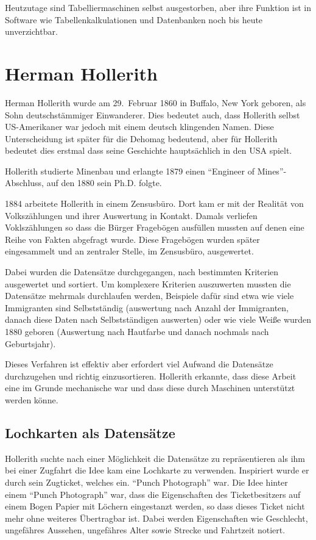 \documentclass[parskip=half]{scrartcl}
\begin{document}
Heutzutage sind Tabelliermaschinen selbst ausgestorben, aber ihre Funktion ist
in Software wie Tabellenkalkulationen und Datenbanken noch bis heute
unverzichtbar.

\section{Herman Hollerith}
\label{sec:hollerith}

Herman Hollerith wurde am 29.~Februar 1860 in Buffalo, New York geboren, als
Sohn deutschstämmiger Einwanderer. Dies bedeutet auch, dass Hollerith selbst
US-Amerikaner war jedoch mit einem deutsch klingenden Namen. Diese
Unterscheidung ist später für die Dehomag bedeutend, aber für Hollerith
bedeutet dies erstmal dass seine Geschichte hauptsächlich in den USA spielt.

Hollerith studierte Minenbau und erlangte 1879 einen \enquote{Engineer of
Mines}-Abschluss, auf den 1880 sein Ph.D. folgte.



1884 arbeitete Hollerith in einem Zensusbüro. Dort kam er mit der Realität von
Volkszählungen und ihrer Auswertung in Kontakt. Damals verliefen Voklszählungen
so dass die Bürger Fragebögen ausfüllen mussten auf denen eine Reihe von Fakten
abgefragt wurde. Diese Fragebögen wurden später eingesammelt und an zentraler
Stelle, im Zensusbüro, ausgewertet.

Dabei wurden die Datensätze durchgegangen, nach bestimmten Kriterien
ausgewertet und sortiert. Um komplexere Kriterien auszuwerten mussten die
Datensätze mehrmals durchlaufen werden, Beispiele dafür sind etwa wie viele
Immigranten sind Selbstständig (auswertung nach Anzahl der Immigranten, danach
diese Daten nach Selbstständigen auswerten) oder wie viele Weiße wurden 1880
geboren (Auswertung nach Hautfarbe und danach nochmals nach Geburtsjahr).

Dieses Verfahren ist effektiv aber erfordert viel Aufwand die Datensätze
durchzugehen und richtig einzusortieren. Hollerith erkannte, dass diese Arbeit
eine im Grunde mechanische war und dass diese durch Maschinen unterstützt
werden könne.

\subsection{Lochkarten als Datensätze}
\label{sec:lochkarten}

Hollerith suchte nach einer Möglichkeit die Datensätze zu repräsentieren als
ihm bei einer Zugfahrt die Idee kam eine Lochkarte zu verwenden. Inspiriert
wurde er durch sein Zugticket, welches ein. \enquote{Punch Photograph} war. Die
Idee hinter einem \enquote{Punch Photograph} war, dass die Eigenschaften des
Ticketbesitzers auf einem Bogen Papier mit Löchern eingestanzt werden, so dass
dieses Ticket nicht mehr ohne weiteres Übertragbar ist. Dabei werden
Eigenschaften wie Geschlecht, ungefähres Aussehen, ungefähres Alter sowie
Strecke und Fahrtzeit notiert.
\end{document}
